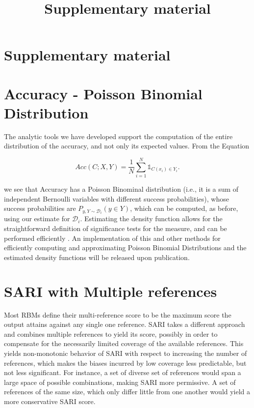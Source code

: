 \documentclass[letterpaper, 11pt]{article}
\newenvironment{myequation}{
  \vspace{-1em}
 \begin{equation}
}{
 \end{equation}
 \vspace{-1.2em}
}
\begin{document}
\appendix

\title{Supplementary material}
\onecolumn
\section*{Supplementary material}
\section{Accuracy - Poisson Binomial Distribution}\label{ap:poibin}
The analytic tools we have developed support the computation of the entire distribution of the accuracy, and not only its expected values. From the Equation 
	
	\begin{myequation}\label{eq:acc_def}
		Acc\left(C;X,Y\right) = \frac{1}{N} \sum_{i=1}^N \mathds{1}_{C(x_i) \in Y_i}.
	\end{myequation}
	
\noindent
 we see that Accuracy has a Poisson Binominal distribution (i.e., it is a sum of independent Bernoulli variables with different success probabilities), whose success probabilities are $P_{y,Y \sim \mathcal{D}_i}(y \in Y)$, which can be computed, as before, using our estimate for $\mathcal{D}_i$. Estimating the density function allows for the straightforward definition of significance tests for the measure, and can be performed efficiently \cite{hong2013computing}. An implementation of this and other methods for efficiently computing and approximating Poisson Binomial Distributions and the estimated density functions will be released upon publication.

\section{SARI with Multiple references}\label{ap:sari-assum}
Most RBMs define their multi-reference score to be the maximum score the
output attains against any single one reference.
SARI takes a different approach and combines multiple references to yield its score, 
possibly in order to compensate for the necessarily limited coverage of the available
references. This yields non-monotonic behavior of SARI with respect to increasing
the number of references, which makes the biases incurred by low coverage less predictable,
but not less significant.
For instance, a set of diverse set of references would span a large space of possible
combinations, making SARI more permissive. A set of references of the same size, which only differ little
from one another would yield a more conservative SARI score.
\end{document}
